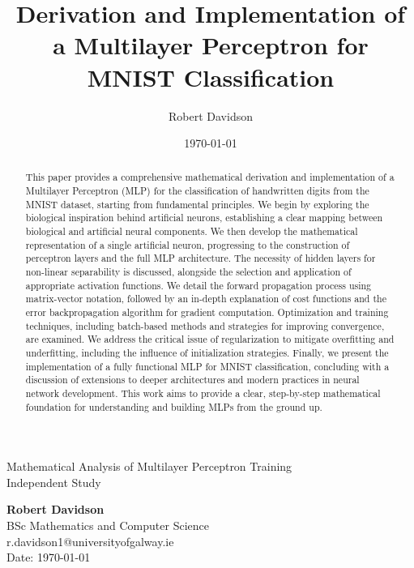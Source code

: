 \documentclass[9pt]{extarticle}
\title{Derivation and Implementation of a Multilayer Perceptron for MNIST Classification}
\author{Robert Davidson}
\date{\today}
\theoremstyle{plain}
\theoremstyle{definition}
\theoremstyle{remark}
\begin{document}
\begin{center}
    Mathematical Analysis of Multilayer Perceptron Training\\
    Independent Study\\[24pt]
    \LARGE

    \Large
    \textbf{Robert Davidson}\\[6pt]
    \small
    BSc Mathematics and Computer Science \\ r.davidson1@universityofgalway.ie\\[6pt]
    Date: \today\\[12pt]
\end{center}
\begin{abstract}
    \begin{adjustwidth}{1cm}{1cm}
        This paper provides a comprehensive mathematical derivation and implementation of a Multilayer Perceptron (MLP)
        for the classification of handwritten digits from the MNIST dataset, starting from fundamental principles.
        We begin by exploring the biological inspiration behind artificial neurons, establishing a clear mapping between biological and artificial neural components.
        We then develop the mathematical representation of a single artificial neuron, progressing to the construction of perceptron layers and the full MLP architecture.
        The necessity of hidden layers for non-linear separability is discussed, alongside the selection and application of appropriate activation functions.
        We detail the forward propagation process using matrix-vector notation, followed by an in-depth explanation of cost functions and the error backpropagation algorithm
        for gradient computation. Optimization and training techniques, including batch-based methods and strategies for improving convergence, are examined.
        We address the critical issue of regularization to mitigate overfitting and underfitting, including the influence of initialization strategies.
        Finally, we present the implementation of a fully functional MLP for MNIST classification, concluding with a discussion of extensions to deeper architectures
        and modern practices in neural network development. This work aims to provide a clear, step-by-step mathematical foundation for understanding and building MLPs from the ground up.
    \end{adjustwidth}
\end{abstract}

\vspace{1.5cm}
\end{document}

